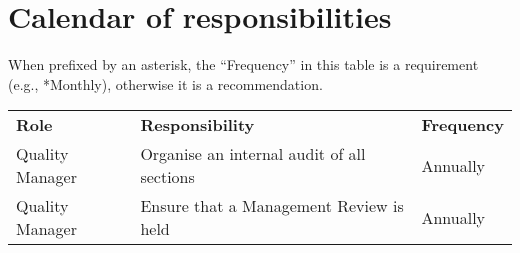 \section{Calendar of responsibilities}
When prefixed by an asterisk, the ``Frequency” in this table is a requirement (e.g., *Monthly), otherwise it is a recommendation.

\begin{center}
{\renewcommand*{\arraystretch}{1.4}
\begin{tabular}{p{14.07em}p{20em}p{5em}}
	\rowcolor[rgb]{ 0,  0,  0} 
	\textcolor[rgb]{ 1,  1,  1}{\textbf{Role}} & 
	\textcolor[rgb]{ 1,  1,  1}{\textbf{Responsibility}} &
	\textcolor[rgb]{ 1,  1,  1}{\textbf{Frequency}} \\
Quality Manager & Organise an internal audit of all sections & Annually \\ 
Quality Manager & Ensure that a Management Review is held & Annually \\ 

\hline 
\end{tabular} 
}
\end{center}